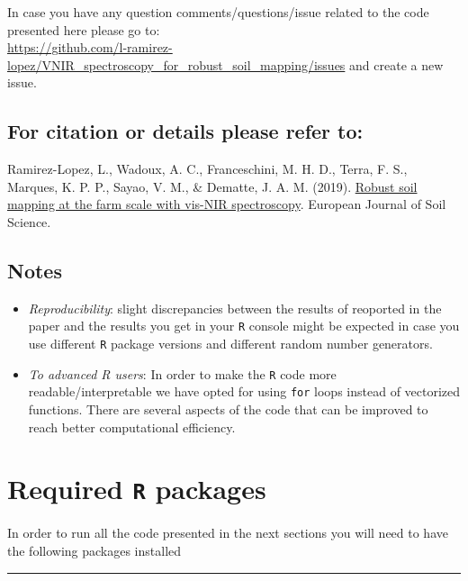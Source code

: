 \documentclass[]{book}
\begin{document}
In case you have any question comments/questions/issue related to the code presented here please go to:\\
\url{https://github.com/l-ramirez-lopez/VNIR_spectroscopy_for_robust_soil_mapping/issues} and create a new issue.

\hypertarget{for-citation-or-details-please-refer-to}{%
\section{For citation or details please refer to:}\label{for-citation-or-details-please-refer-to}}

Ramirez-Lopez, L., Wadoux, A. C., Franceschini, M. H. D., Terra, F. S., Marques, K. P. P., Sayao, V. M., \& Dematte, J. A. M. (2019). \href{https://onlinelibrary.wiley.com/doi/10.1111/ejss.12752}{Robust soil mapping at the farm scale with vis-NIR spectroscopy}. European Journal of Soil Science.

\hypertarget{notes}{%
\section{Notes}\label{notes}}

\begin{itemize}
\item
  \emph{Reproducibility}: slight discrepancies between the results of reoported in the paper and the results you get in your \texttt{R} console might be expected in case you use different \texttt{R} package versions and different random number generators.
\item
  \emph{To advanced R users}: In order to make the \texttt{R} code more readable/interpretable we have opted for using \texttt{for} loops instead of vectorized functions. There are several aspects of the code that can be improved to reach better computational efficiency.
\end{itemize}

\hypertarget{required-r-packages}{%
\chapter{\texorpdfstring{Required \texttt{R} packages}{Required R packages}}\label{required-r-packages}}

In order to run all the code presented in the next sections you will need to have the following packages installed

\begin{center}\rule{0.5\linewidth}{\linethickness}\end{center}
\end{document}
